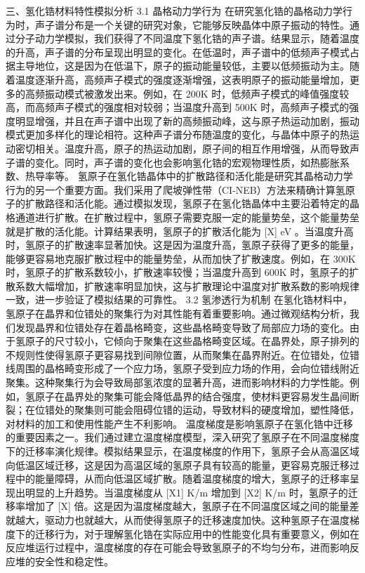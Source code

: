 三、氢化锆材料特性模拟分析
3.1 晶格动力学行为
在研究氢化锆的晶格动力学行为时，声子谱分布是一个关键的研究对象，它能够反映晶体中原子振动的特性。通过分子动力学模拟，我们获得了不同温度下氢化锆的声子谱。结果显示，随着温度的升高，声子谱的分布呈现出明显的变化。在低温时，声子谱中的低频声子模式占据主导地位，这是因为在低温下，原子的振动能量较低，主要以低频振动为主。随着温度逐渐升高，高频声子模式的强度逐渐增强，这表明原子的振动能量增加，更多的高频振动模式被激发出来。例如，在 200K 时，低频声子模式的峰值强度较高，而高频声子模式的强度相对较弱；当温度升高到 500K 时，高频声子模式的强度明显增强，并且在声子谱中出现了新的高频振动峰，这与原子热运动加剧，振动模式更加多样化的理论相符。这种声子谱分布随温度的变化，与晶体中原子的热运动密切相关。温度升高，原子的热运动加剧，原子间的相互作用增强，从而导致声子谱的变化。同时，声子谱的变化也会影响氢化锆的宏观物理性质，如热膨胀系数、热导率等。
氢原子在氢化锆晶体中的扩散路径和活化能是研究其晶格动力学行为的另一个重要方面。我们采用了爬坡弹性带（CI-NEB）方法来精确计算氢原子的扩散路径和活化能。通过模拟发现，氢原子在氢化锆晶体中主要沿着特定的晶格通道进行扩散。在扩散过程中，氢原子需要克服一定的能量势垒，这个能量势垒就是扩散的活化能。计算结果表明，氢原子的扩散活化能为 [X] eV 。当温度升高时，氢原子的扩散速率显著加快。这是因为温度升高，氢原子获得了更多的能量，能够更容易地克服扩散过程中的能量势垒，从而加快了扩散速度。例如，在 300K 时，氢原子的扩散系数较小，扩散速率较慢；当温度升高到 600K 时，氢原子的扩散系数大幅增加，扩散速率明显加快，这与扩散理论中温度对扩散系数的影响规律一致，进一步验证了模拟结果的可靠性。
3.2 氢渗透行为机制
在氢化锆材料中，氢原子在晶界和位错处的聚集行为对其性能有着重要影响。通过微观结构分析，我们发现晶界和位错处存在着晶格畸变，这些晶格畸变导致了局部应力场的变化。由于氢原子的尺寸较小，它倾向于聚集在这些晶格畸变区域。在晶界处，原子排列的不规则性使得氢原子更容易找到间隙位置，从而聚集在晶界附近。在位错处，位错线周围的晶格畸变形成了一个应力场，氢原子受到应力场的作用，会向位错线附近聚集。这种聚集行为会导致局部氢浓度的显著升高，进而影响材料的力学性能。例如，氢原子在晶界处的聚集可能会降低晶界的结合强度，使材料更容易发生晶间断裂；在位错处的聚集则可能会阻碍位错的运动，导致材料的硬度增加，塑性降低，对材料的加工和使用性能产生不利影响。
温度梯度是影响氢原子在氢化锆中迁移的重要因素之一。我们通过建立温度梯度模型，深入研究了氢原子在不同温度梯度下的迁移率演化规律。模拟结果显示，在温度梯度的作用下，氢原子会从高温区域向低温区域迁移，这是因为高温区域的氢原子具有较高的能量，更容易克服迁移过程中的能量障碍，从而向低温区域扩散。随着温度梯度的增大，氢原子的迁移率呈现出明显的上升趋势。当温度梯度从 [X1] K/m 增加到 [X2] K/m 时，氢原子的迁移率增加了 [X] 倍。这是因为温度梯度越大，氢原子在不同温度区域之间的能量差就越大，驱动力也就越大，从而使得氢原子的迁移速度加快。这种氢原子在温度梯度下的迁移行为，对于理解氢化锆在实际应用中的性能变化具有重要意义，例如在反应堆运行过程中，温度梯度的存在可能会导致氢原子的不均匀分布，进而影响反应堆的安全性和稳定性。
